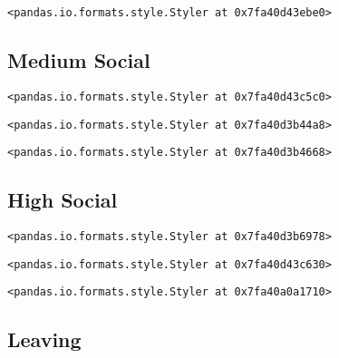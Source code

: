 \documentclass[11pt]{article}
\begin{document}
    
    
    \begin{verbatim}
<pandas.io.formats.style.Styler at 0x7fa40d43ebe0>
    \end{verbatim}

    
    \hypertarget{medium-social}{%
\subsection{\texorpdfstring{\textbf{Medium
Social}}{Medium Social}}\label{medium-social}}

    
    
    \begin{verbatim}
<pandas.io.formats.style.Styler at 0x7fa40d43c5c0>
    \end{verbatim}

    
    
    \begin{verbatim}
<pandas.io.formats.style.Styler at 0x7fa40d3b44a8>
    \end{verbatim}

    
    
    \begin{verbatim}
<pandas.io.formats.style.Styler at 0x7fa40d3b4668>
    \end{verbatim}

    
    \hypertarget{high-social}{%
\subsection{\texorpdfstring{\textbf{High
Social}}{High Social}}\label{high-social}}

    
    
    \begin{verbatim}
<pandas.io.formats.style.Styler at 0x7fa40d3b6978>
    \end{verbatim}

    
    
    \begin{verbatim}
<pandas.io.formats.style.Styler at 0x7fa40d43c630>
    \end{verbatim}

    
    
    \begin{verbatim}
<pandas.io.formats.style.Styler at 0x7fa40a0a1710>
    \end{verbatim}

    
    \hypertarget{leaving}{%
\subsection{\texorpdfstring{\textbf{Leaving}}{Leaving}}\label{leaving}}
\end{document}
